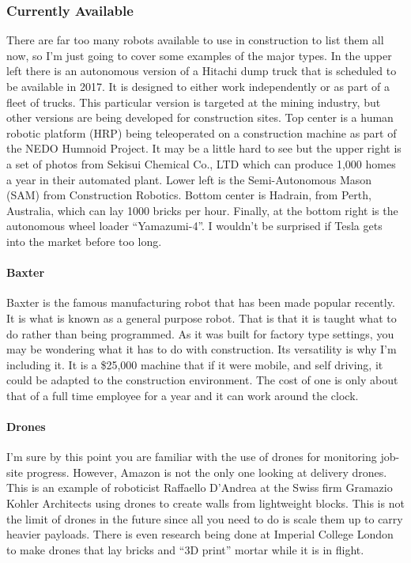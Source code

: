 \documentclass[12pt]{article}
\begin{document}
\subsubsection{Currently Available}
There are far too many robots available to use in construction to list them all now, so I'm just going to cover some examples of the major types.  In the upper left there is an autonomous version of a Hitachi dump truck that is scheduled to be available in 2017. It is designed to either work independently or as part of a fleet of trucks. This particular version is targeted at the mining industry, but other versions are being developed for construction sites.  Top center is a human robotic platform (HRP) being teleoperated on a construction machine as part of the NEDO Humnoid Project.  It may be a little hard to see but the upper right is a set of photos from Sekisui Chemical Co., LTD which can produce 1,000 homes a year in their automated plant.  Lower left is the Semi-Autonomous Mason (SAM) from Construction Robotics.  Bottom center is Hadrain, from Perth, Australia, which can lay 1000 bricks per hour.  Finally, at the bottom right is the autonomous wheel loader ``Yamazumi-4''.  I wouldn't be surprised if Tesla gets into the market before too long.
\paragraph{Baxter}
Baxter is the famous manufacturing robot that has been made popular recently.  It is what is known as a general purpose robot.  That is that it is taught what to do rather than being programmed.  As it was built for factory type settings, you may be wondering what it has to do with construction.  Its versatility is why I'm including it.  It is a \$25,000 machine that if it were mobile, and self driving, it could be adapted to the construction environment.  The cost of one is only about that of a full time employee for a year and it can work around the clock.
\paragraph{Drones}
I'm sure by this point you are familiar with the use of drones for monitoring job-site progress.  However, Amazon is not the only one looking at delivery drones.  This is an example of roboticist Raffaello D’Andrea at the Swiss firm Gramazio Kohler Architects using drones to create walls from lightweight blocks.  This is not the limit of drones in the future since all you need to do is scale them up to carry heavier payloads. There is even research being done at Imperial College London to make drones that lay bricks and ``3D print'' mortar while it is in flight.
\end{document}
